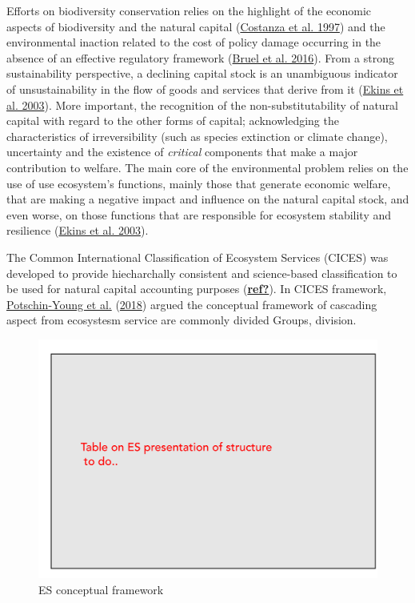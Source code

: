 \documentclass[
  14pt,
]{extarticle}
\begin{document}
Efforts on biodiversity conservation relies on the highlight of the economic aspects of biodiversity and the natural capital (\protect\hyperlink{ref-Costanza1997}{Costanza et al. 1997}) and the environmental inaction related to the cost of policy damage occurring in the absence of an effective regulatory framework (\protect\hyperlink{ref-Bruel2016}{Bruel et al. 2016}).
From a strong sustainability perspective, a declining capital stock is an unambiguous indicator of unsustainability in the flow of goods and services that derive from it (\protect\hyperlink{ref-Ekins2003}{Ekins et al. 2003}).
More important, the recognition of the non-substitutability of natural capital with regard to the other forms of capital; acknowledging the characteristics of irreversibility (such as species extinction or climate change), uncertainty and the existence of \emph{critical} components that make a major contribution to welfare.
The main core of the environmental problem relies on the use of use ecosystem's functions, mainly those that generate economic welfare, that are making a negative impact and influence on the natural capital stock, and even worse, on those functions that are responsible for ecosystem stability and resilience (\protect\hyperlink{ref-Ekins2003}{Ekins et al. 2003}).

The Common International Classification of Ecosystem Services (CICES) was developed to provide hiecharchally consistent and science-based classification to be used for natural capital accounting purposes (\protect\hyperlink{ref-ref}{\textbf{ref?}}).
In CICES framework, \protect\hyperlink{ref-Potschin-Young2018}{Potschin-Young et al.} (\protect\hyperlink{ref-Potschin-Young2018}{2018}) argued the conceptual framework of cascading aspect from ecosystesm service are commonly divided Groups, division.

\begin{figure}[!ht]

{\centering \includegraphics[width=1\linewidth]{Figures/cices} 

}

\caption{ES conceptual framework}\label{fig:Fig-ES-cices}
\end{figure}
\end{document}
